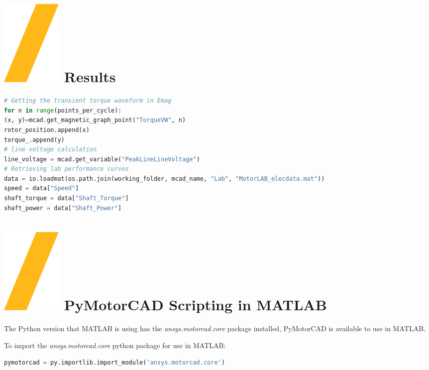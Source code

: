 \documentclass[landscape]{article}
\begin{document}
\begin{multicols}{3}
\section{\includegraphics[height=\fontcharht\font`\S]{slash.png} Results}
\begin{lstlisting}[language=Python]
# Getting the transient torque waveform in Emag 
for n in range(points_per_cycle):
(x, y)=mcad.get_magnetic_graph_point("TorqueVW", n)
rotor_position.append(x)
torque_.append(y)
# line voltage calculation
line_voltage = mcad.get_variable("PeakLineLineVoltage")
# Retrieving lab performance curves 
data = io.loadmat(os.path.join(working_folder, mcad_name, "Lab", "MotorLAB_elecdata.mat"))
speed = data["Speed"]
shaft_torque = data["Shaft_Torque"]
shaft_power = data["Shaft_Power"]
\end{lstlisting}

\section{\includegraphics[height=\fontcharht\font`\S]{slash.png} PyMotorCAD Scripting in MATLAB}
The Python version that MATLAB is using has the \textit{ansys.motorcad.core} package installed, PyMotorCAD is available to use in MATLAB.

To import the \textit{ansys.motorcad.core} python package for use in MATLAB:
\begin{lstlisting}[language=Python]
pymotorcad = py.importlib.import_module('ansys.motorcad.core')	
\end{lstlisting}


\end{multicols}
\end{document}
